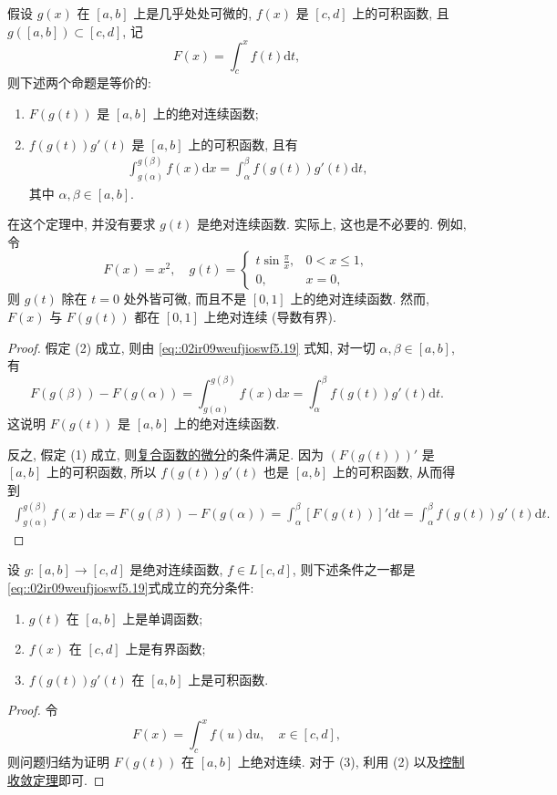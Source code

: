 \documentclass[../../main.tex]{subfiles}%
\begin{document}
\begin{theorem}[换元积分法]\label{theorem:实变函数--换元积分法}
假设 $g(x)$ 在 $[a,b]$ 上是几乎处处可微的, $f(x)$ 是 $[c,d]$ 上的可积函数, 且 $g([a,b])\subset[c,d]$, 记
\[
F(x) = \int_c^x f(t)\mathrm{d}t,
\]
则下述两个命题是等价的:
\begin{enumerate}[(1)]
\item $F(g(t))$ 是 $[a,b]$ 上的绝对连续函数;
\item $f(g(t))g'(t)$ 是 $[a,b]$ 上的可积函数, 且有
\begin{align}
\int_{g(\alpha)}^{g(\beta)} f(x)\mathrm{d}x = \int_{\alpha}^{\beta} f(g(t))g'(t)\mathrm{d}t, \label{eq::02ir09weufjioswf5.19}
\end{align}
其中 $\alpha,\beta\in[a,b]$.
\end{enumerate}
\end{theorem}
\begin{remark}
在这个定理中, 并没有要求 $g(t)$ 是绝对连续函数. 实际上, 这也是不必要的. 例如, 令
\[
F(x) = x^2, \quad g(t) =
\begin{cases}
t\sin\frac{\pi}{x}, & 0<x\leqslant 1, \\
0, & x=0,
\end{cases}
\]
则 $g(t)$ 除在 $t=0$ 处外皆可微, 而且不是 $[0,1]$ 上的绝对连续函数. 然而, $F(x)$ 与 $F(g(t))$ 都在 $[0,1]$ 上绝对连续 (导数有界).
\end{remark}
\begin{proof}
假定 (2) 成立, 则由 \eqref{eq::02ir09weufjioswf5.19} 式知, 对一切 $\alpha,\beta\in[a,b]$, 有
\[
F(g(\beta)) - F(g(\alpha)) = \int_{g(\alpha)}^{g(\beta)} f(x)\mathrm{d}x = \int_{\alpha}^{\beta} f(g(t))g'(t)\mathrm{d}t.
\]
这说明 $F(g(t))$ 是 $[a,b]$ 上的绝对连续函数.

反之, 假定 (1) 成立, 则\hyperref[theorem:实变函数--复合函数的微分]{复合函数的微分}的条件满足. 因为 $(F(g(t)))'$ 是 $[a,b]$ 上的可积函数, 所以 $f(g(t))g'(t)$ 也是 $[a,b]$ 上的可积函数, 从而得到
\begin{align*}
\int_{g(\alpha)}^{g(\beta)} f(x)\mathrm{d}x = F(g(\beta)) - F(g(\alpha)) 
= \int_{\alpha}^{\beta} [F(g(t))]'\mathrm{d}t = \int_{\alpha}^{\beta} f(g(t))g'(t)\mathrm{d}t.
\end{align*}
\end{proof}

\begin{corollary}
设 $g: [a,b]\to[c,d]$ 是绝对连续函数, $f\in L[c,d]$, 则下述条件之一都是\eqref{eq::02ir09weufjioswf5.19}式成立的充分条件:
\begin{enumerate}[(1)]
\item $g(t)$ 在 $[a,b]$ 上是单调函数;
\item $f(x)$ 在 $[c,d]$ 上是有界函数;
\item $f(g(t))g'(t)$ 在 $[a,b]$ 上是可积函数.
\end{enumerate}
\end{corollary}
\begin{proof}
令
\[
F(x) = \int_c^x f(u)\mathrm{d}u, \quad x\in[c,d],
\]
则问题归结为证明 $F(g(t))$ 在 $[a,b]$ 上绝对连续. 对于 (3), 利用 (2) 以及\hyperref[theorem:控制收敛定理]{控制收敛定理}即可.
\end{proof}
\end{document}
